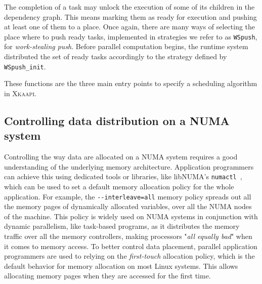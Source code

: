 \documentclass{Styles/llncs}
\newcommand{\kaapi}{\textsc{\mbox{Xkaapi}}\xspace}
\begin{document}
The completion of a task may unlock the execution of some of its children in the dependency graph.
This means marking them as ready for execution and pushing at least one of them to a place.
Once again, there are many ways of selecting the place where to push ready tasks, implemented in strategies we refer to as \verb/WSpush/, for \emph{work-stealing push}.
Before parallel computation begins, the runtime system distributed the set of ready tasks accordingly to the strategy defined by \verb/WSpush_init/.

These functions are the three main entry points to specify a scheduling algorithm in \kaapi. 

\subsection{Controlling data distribution on a NUMA system}

Controlling the way data are allocated on a NUMA system requires a good understanding of the underlying memory architecture.
Application programmers can achieve this using dedicated tools or libraries, like libNUMA's \verb!numactl!~\cite{DBLP:journals/corr/abs-1101-0093}, which can be used to set a default memory allocation policy for the whole application.
For example, the \verb!--interleave=all! memory policy spreads out all the memory pages of dynamically allocated variables, over all the NUMA nodes of the machine.
This policy is widely used on NUMA systems in conjunction with dynamic parallelism, like task-based programs, as it distributes the memory traffic over all the memory controllers, making processors "\emph{all equally bad}" when it comes to memory access.
To better control data placement, parallel application programmers are used to relying on the \emph{first-touch} allocation policy, which is the default behavior for memory allocation on most Linux systems.
This allows allocating memory pages when they are accessed for the first time.
\end{document}
